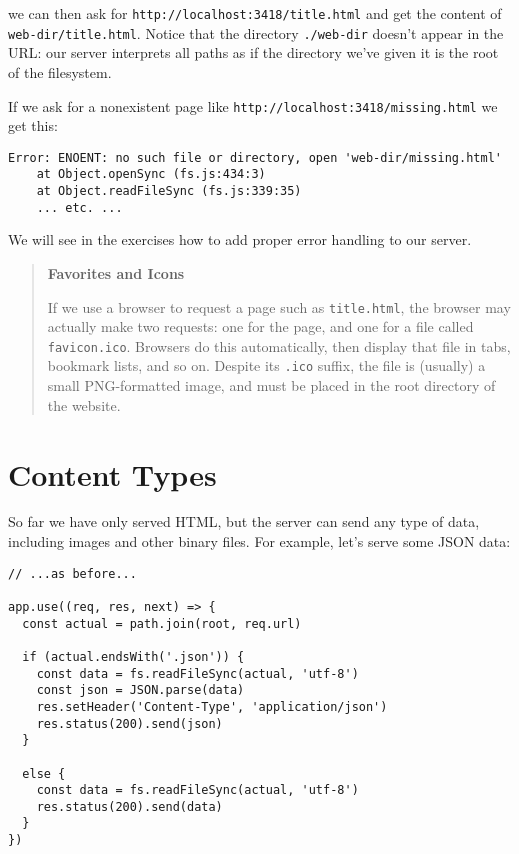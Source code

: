\noindent
we can then ask for \texttt{http://localhost:3418/title.html}
and get the content of \texttt{web-dir/title.html}.
Notice that the directory \texttt{./web-dir} doesn't appear in the URL:
our server interprets all paths as if the directory we've given it
is the root of the filesystem.

If we ask for a nonexistent page like \texttt{http://localhost:3418/missing.html}
we get this:

\begin{verbatim}
Error: ENOENT: no such file or directory, open 'web-dir/missing.html'
    at Object.openSync (fs.js:434:3)
    at Object.readFileSync (fs.js:339:35)
    ... etc. ...
\end{verbatim}

We will see in the exercises how to add proper error handling to our server.

\begin{quote}\setlength{\parindent}{0pt}
\textbf{Favorites and Icons}

If we use a browser to request a page such as \texttt{title.html},
the browser may actually make two requests:
one for the page,
and one for a file called \texttt{favicon.ico}.
Browsers do this automatically,
then display that file in tabs, bookmark lists, and so on.
Despite its \texttt{.ico} suffix,
the file is (usually) a small PNG-formatted image,
and must be placed in the root directory of the website.
\end{quote}

\section{Content Types}\label{s:server-content-types}

So far we have only served HTML,
but the server can send any type of data,
including images and other binary files.
For example,
let's serve some JSON data:

\begin{verbatim}
// ...as before...

app.use((req, res, next) => {
  const actual = path.join(root, req.url)

  if (actual.endsWith('.json')) {
    const data = fs.readFileSync(actual, 'utf-8')
    const json = JSON.parse(data)
    res.setHeader('Content-Type', 'application/json')
    res.status(200).send(json)
  }

  else {
    const data = fs.readFileSync(actual, 'utf-8')
    res.status(200).send(data)
  }
})
\end{verbatim}

